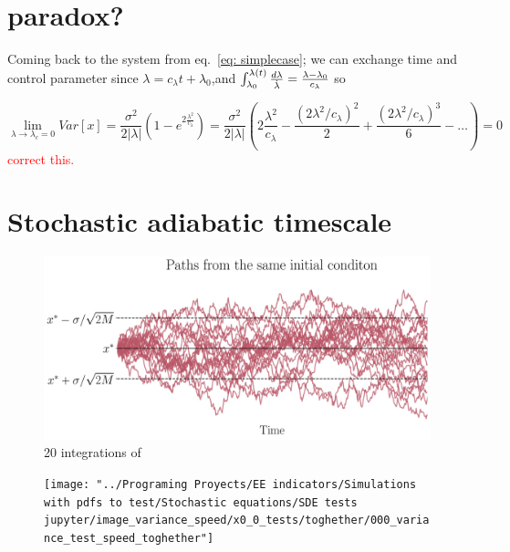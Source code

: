 \section{paradox?}



Coming back to the system from eq.~\ref{eq: simplecase}; we can exchange time and control parameter since $\lambda=c_\lambda t+\lambda_0$,and  $\int_{\lambda_0}^{\lambda(t)} \frac{d\lambda}{\dot \lambda}=\frac{\lambda-\lambda_0}{c_\lambda}$ so 

\begin{equation}
	\lim_{\lambda\to\lambda_c=0} Var[x]=\frac{\sigma^2}{2 |\lambda|}(1-e^{2\frac{\lambda^2}{c_\lambda}})=\frac{\sigma^2}{2 |\lambda|}(2\frac{\lambda^2}{c_\lambda}-\frac{(2\lambda^2/c_\lambda)^2}{2}+\frac{(2\lambda^2/c_\lambda)^3}{6}-\dots)=0
	\label{eq: ST_wellexample}
\end{equation}
\textcolor{red}{correct this.}

\section{Stochastic adiabatic timescale}
\label{apx:sameinit}


\begin{figure}[htb]
	\centering
	\includegraphics[width=0.9\linewidth]{Images/Metrics/same_init2}
	\caption{20 integrations of}
	\label{fig:sameinit}
\end{figure}



\begin{figure}
	\centering
	\texttt{[image: "../Programing Proyects/EE indicators/Simulations with pdfs to test/Stochastic equations/SDE tests jupyter/image\_variance\_speed/x0\_0\_tests/toghether/000\_variance\_test\_speed\_toghether"]}
	\caption{}
	\label{fig:000variancetestspeedtoghether2}
\end{figure}



